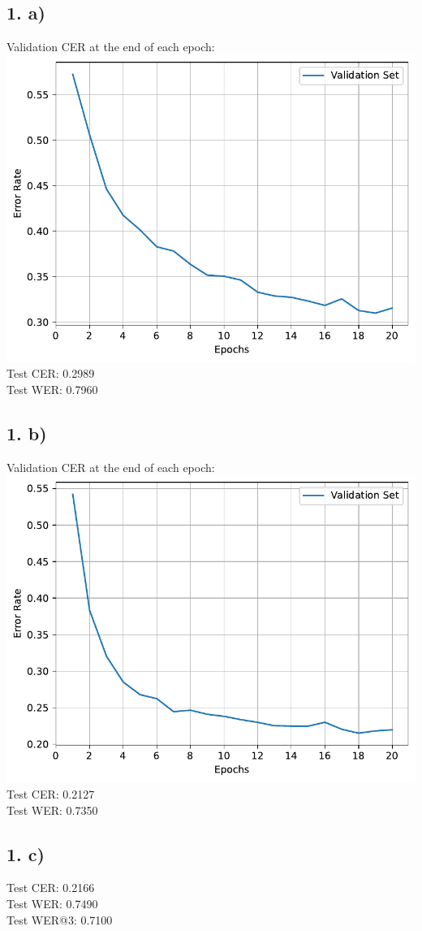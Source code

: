 \documentclass[12pt,a4paper]{article}
\begin{document}
    \subsection{1. a)}
        Validation CER at the end of each epoch: \\
        \includegraphics[width=\imagewidth]{q3/q3_1_no-attn.pdf} \\
        Test CER: 0.2989 \\
        Test WER: 0.7960

    \subsection{1. b)}
        Validation CER at the end of each epoch: \\
        \includegraphics[width=\imagewidth]{q3/q3_2_attn.pdf} \\
        Test CER: 0.2127 \\
        Test WER: 0.7350        

    \subsection{1. c)}
        Test CER: 0.2166 \\
        Test WER: 0.7490 \\
        Test WER@3: 0.7100
        
\end{document}
